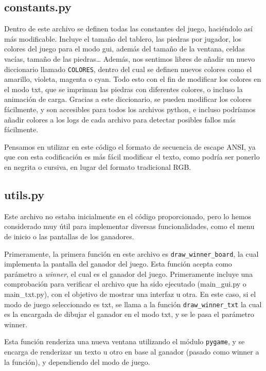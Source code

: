\documentclass[a4paper,12pt]{article}
\begin{document}
\vspace{\baselineskip}
\subsection{constants.py}
Dentro de este archivo se definen todas las constantes del juego, haciéndolo así más modificable. Incluye el tamaño del tablero, las piedras por jugador,
los colores del juego para el modo gui, además del tamaño de la ventana, celdas vacías, tamaño de las piedras\ldots
Además, nos sentimos libres de añadir un nuevo diccionario llamado \texttt{COLORES}, dentro del cual se definen nuevos colores como el amarillo, violeta,
magenta o cyan. Todo esto con el fin de modificar los colores en el modo txt, que se impriman las piedras con diferentes colores, o incluso la animación de carga.
Gracias a este diccionario, se pueden modificar los colores fácilmente, y son accesibles para todos los archivos python, e incluso podríamos añadir colores
a los logs de cada archivo para detectar posibles fallos más fácilmente.

Pensamos en utilizar en este código el formato de secuencia de escape ANSI, ya que con esta codificación es más fácil modificar el texto, como podría ser ponerlo
en negrita o cursiva, en lugar del formato tradicional RGB. 

\subsection{utils.py}
Este archivo no estaba inicialmente en el código proporcionado, pero lo hemos considerado muy útil para implementar diversas funcionalidades, como el menu de inicio o 
las pantallas de los ganadores.

\vspace{\baselineskip}
Primeramente, la primera función en este archivo es \texttt{draw\_winner\_board}, la cual implementa la pantalla del ganador del juego. Esta función acepta como parámetro 
a \textit{winner}, el cual es el ganador del juego. Primeramente incluye una comprobación para verificar el archivo que ha sido ejecutado (main\_gui.py o main\_txt.py), con el 
objetivo de mostrar una interfaz u otra. En este caso, si el modo de juego seleccionado es txt, se llama a la función \texttt{draw\_winner\_txt} la cual es la encargada de 
dibujar el ganador en el modo txt, y se le pasa el parámetro winner.

\vspace{\baselineskip}
Esta función renderiza una nueva ventana utilizando el módulo \texttt{pygame}, y se encarga de renderizar un texto u otro en base al ganador (pasado como winner a la función), y 
dependiendo del modo de juego.
\end{document}
